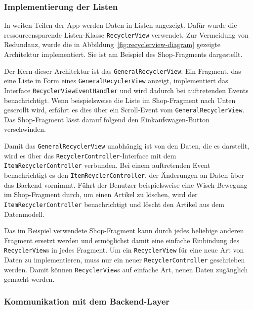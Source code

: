 \subsubsection{Implementierung der Listen}

In weiten Teilen der App werden Daten in Listen angezeigt.
Dafür wurde die ressourcensparende Listen-Klasse \texttt{RecyclerView} verwendet.
Zur Vermeidung von Redundanz, wurde die in Abbildung~\ref{fig:recyclerview-diagram} gezeigte Architektur implementiert.
Sie ist am Beispiel des Shop-Fragments dargestellt.

Der Kern dieser Architektur ist das \texttt{GeneralRecyclerView}.
Ein Fragment, das eine Liste in Form eines \texttt{GeneralRecyclerView} anzeigt, implementiert das Interface \texttt{RecyclerViewEventHandler} und wird dadurch bei auftretenden Events benachrichtigt.
Wenn beispielsweise die Liste im Shop-Fragment nach Unten gescrollt wird, erfährt es dies über ein Scroll-Event vom \texttt{GeneralRecyclerView}.
Das Shop-Fragment lässt darauf folgend den Einkaufswagen-Button verschwinden.

Damit das \texttt{GeneralRecyclerView} unabhängig ist von den Daten, die es darstellt, wird es über das \texttt{RecyclerController}-Interface mit dem \texttt{ItemRecyclerController} verbunden.
Bei einem auftretenden Event benachrichtigt es den \texttt{ItemReyclerController}, der Änderungen an Daten über das Backend vornimmt.
Führt der Benutzer beispielsweise eine Wisch-Bewegung im Shop-Fragment durch, um einen Artikel zu löschen, wird der \texttt{ItemRecyclerController} benachrichtigt und löscht den Artikel aus dem Datenmodell.

Das im Beispiel verwendete Shop-Fragment kann durch jedes beliebige anderen Fragment ersetzt werden und ermöglichst damit eine einfache Einbindung des \texttt{RecyclerView}s in jedes Fragment.
Um ein \texttt{RecyclerView} für eine neue Art von Daten zu implementieren, muss nur ein neuer \texttt{RecyclerController} geschrieben werden.
Damit können \texttt{RecyclerView}s auf einfache Art, neuen Daten zugänglich gemacht werden.


\subsubsection{Kommunikation mit dem Backend-Layer}

